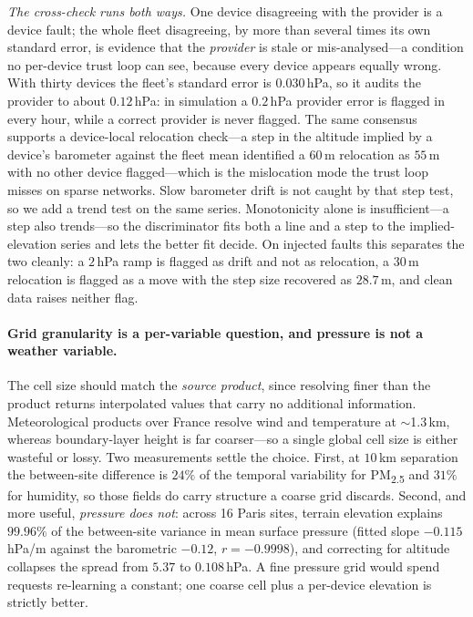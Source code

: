 \documentclass[10pt]{article}
\begin{document}
\emph{The cross-check runs both ways.} One device disagreeing with the provider is
a device fault; the whole fleet disagreeing, by more than several times its own
standard error, is evidence that the \emph{provider} is stale or mis-analysed---a
condition no per-device trust loop can see, because every device appears equally
wrong. With thirty devices the fleet's standard error is $0.030$\,hPa, so it audits
the provider to about $0.12$\,hPa: in simulation a $0.2$\,hPa provider error is
flagged in every hour, while a correct provider is never flagged. The same
consensus supports a device-local relocation check---a step in the altitude implied
by a device's barometer against the fleet mean identified a $60$\,m relocation as
$55$\,m with no other device flagged---which is the mislocation mode the trust loop
misses on sparse networks. Slow barometer drift is not caught by that step test, so we add a trend test on
the same series. Monotonicity alone is insufficient---a step also trends---so the
discriminator fits both a line and a step to the implied-elevation series and lets
the better fit decide. On injected faults this separates the two cleanly: a
$2$\,hPa ramp is flagged as drift and not as relocation, a $30$\,m relocation is
flagged as a move with the step size recovered as $28.7$\,m, and clean data raises
neither flag.

\paragraph{Grid granularity is a per-variable question, and pressure is not a weather variable.}
The cell size should match the \emph{source product}, since resolving finer than
the product returns interpolated values that carry no additional information.
Meteorological products over France resolve wind and temperature at $\sim$1.3\,km,
whereas boundary-layer height is far coarser---so a single global cell size is
either wasteful or lossy. Two measurements settle the choice. First, at $10$\,km
separation the between-site difference is $24\%$ of the temporal variability for
PM\textsubscript{2.5} and $31\%$ for humidity, so those fields do carry structure a
coarse grid discards. Second, and more useful, \emph{pressure does not}: across 16
Paris sites, terrain elevation explains $99.96\%$ of the between-site variance in
mean surface pressure (fitted slope $-0.115$\,hPa/m against the barometric
$-0.12$, $r=-0.9998$), and correcting for altitude collapses the spread from
$5.37$ to $0.108$\,hPa. A fine pressure grid would spend requests re-learning a
constant; one coarse cell plus a per-device elevation is strictly better.
\end{document}
